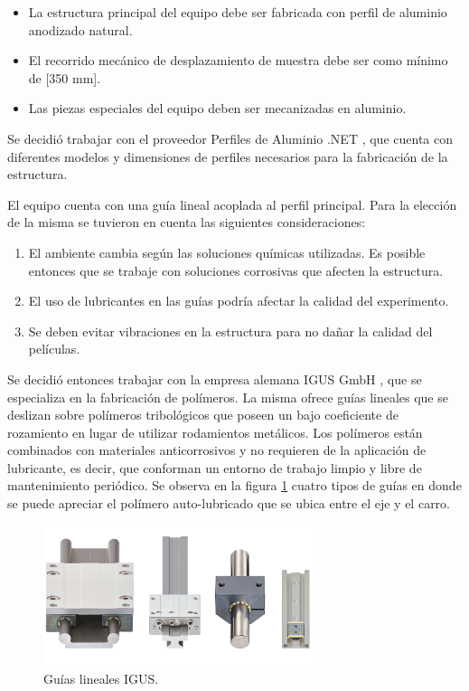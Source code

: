 \begin{itemize}
\item La estructura principal del equipo debe ser fabricada con perfil de aluminio anodizado natural.
\item El recorrido mecánico de desplazamiento de muestra debe ser como mínimo de [350 mm].
\item Las piezas especiales del equipo deben ser mecanizadas en aluminio.

\end{itemize}

Se decidió trabajar con el proveedor Perfiles de Aluminio .NET \citep{web_perfiles_net}, que cuenta con diferentes modelos y dimensiones de perfiles necesarios para la fabricación de la estructura.

El equipo cuenta con una guía lineal acoplada al perfil principal. Para la elección de la misma se tuvieron en cuenta las siguientes consideraciones:

\begin{enumerate}
\item El ambiente cambia  según las soluciones químicas utilizadas. Es posible entonces que se trabaje con soluciones corrosivas que afecten la estructura.  
\item El uso de lubricantes en las guías podría afectar la calidad del experimento.
\item Se deben evitar vibraciones en la estructura para no dañar la calidad del películas.

\end{enumerate}

Se decidió entonces trabajar con la empresa alemana IGUS GmbH \citep{web_igus}, que se especializa en la fabricación de polímeros. La misma ofrece guías lineales que se deslizan sobre polímeros tribológicos que poseen un bajo coeficiente de rozamiento en lugar de utilizar rodamientos metálicos. Los polímeros están combinados con materiales anticorrosivos y no requieren de la aplicación de lubricante, es decir, que conforman un entorno de trabajo limpio y libre de mantenimiento periódico. Se observa en la figura \ref{fig:equipo_mecánico} cuatro tipos de guías en donde se puede apreciar el polímero auto-lubricado que se ubica entre el eje y el carro.

\begin{figure}[ht]
\centering 
\includegraphics[width=0.7\textwidth]{./Figures/guias.png}
\caption{Guías lineales IGUS\protect\footnotemark.}
\label{fig:equipo_mecánico}
\end{figure}


